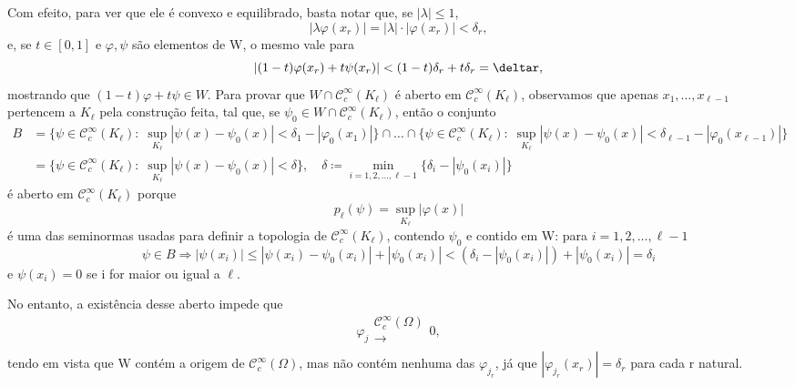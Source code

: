 \documentclass[../distribution_theory_notes.tex]{subfiles}
\begin{document}
\begin{proof*}
                   Com efeito, para ver que ele é convexo e equilibrado, basta notar que, se \(|\lambda |\leq 1\),
                     \[
                       |\lambda \varphi (x_r)| = |\lambda |\cdot |\varphi(x_r)|<\delta_r,
                     \]
                     e, se \(t\in [0,1]\) e \(\varphi , \psi\) são elementos de W, o mesmo vale para 
                       \[
                         |(1-t)\varphi (x_r)+t\psi (x_r)|<(1-t)\delta_r+ t\delta_r = \deltar,
                       \]
                       mostrando que \((1-t)\varphi + t\psi \in W\). Para provar que \(W\cap \mathcal{C}_{c}^{\infty}(K_{\ell})\) é aberto em \(\mathcal{C}_{c}^{\infty}(K_{\ell})\), observamos que apenas \(x_1,\dotsc ,x_{\ell -1}\) pertencem a \(K_{\ell}\) pela construção feita, tal que, se \(\psi_{0}\in W\cap \mathcal{C}_{c}^{\infty}(K_{\ell})\), então o conjunto 
                      \begin{align*}
                        B&=\{\psi \in \mathcal{C}_{c}^{\infty}(K_{\ell}):\; \sup_{K_{\ell}}|\psi (x)-\psi_{0}(x)|<\delta_1-|\varphi_{0}(x_1)|\}\cap \dotsc \cap \{\psi \in \mathcal{C}_{c}^{\infty}(K_{\ell}):\; \sup_{K_{\ell}}|\psi (x)-\psi_{0}(x)|<\delta_{\ell -1}-|\varphi_{0}(x_{\ell -1})|\}\\ 
                         &= \{\psi  \in \mathcal{C}_{c}^{\infty}(K_{\ell}):\; \sup_{K_{\ell}}|\psi (x)-\psi_{0}(x)|<\delta \},\quad \delta\coloneqq \min\limits_{i=1,2,\dotsc ,\ell -1}\{\delta_{i}-|\psi_{0}(x_{i})|\}
                      \end{align*}
                      é aberto em \(\mathcal{C}_{c}^{\infty}(K_{\ell})\) porque 
                        \[
                          p_{\ell}(\psi )=\sup_{K_{\ell}}|\varphi(x)|
                        \]
                        é uma das seminormas usadas para definir a topologia de \(\mathcal{C}_{c}^{\infty}(K_{\ell})\), contendo \(\psi_{0}\) e contido em W: para \(i=1,2,\dotsc , \ell -1\)
                          \[
                            \psi\in B \Rightarrow |\psi(x_{i})|\leq |\psi (x_{i})-\psi_{0}(x_{i})|+|\psi_{0}(x_{i})| < (\delta_{i}-|\psi_{0}(x_{i})|)+|\psi_{0}(x_{i})| = \delta_{i}
                          \]
                          e \(\psi (x_{i})=0\) se i for maior ou igual a \(\ell .\)

                          No entanto, a existência desse aberto impede que 
                          \[
                            \varphi_{j}\substack{\mathcal{C}_{c}^{\infty}(\Omega ) \\ \longrightarrow \\ }0,
                        \]
                        tendo em vista que W contém a origem de \(\mathcal{C}_{c}^{\infty}(\Omega )\), mas não contém nenhuma das \(\varphi_{j_r}\), já que \(|\varphi_{j_r}(x_{r})|=\delta_r\) para cada r natural. 


\end{proof*}
\end{document}
